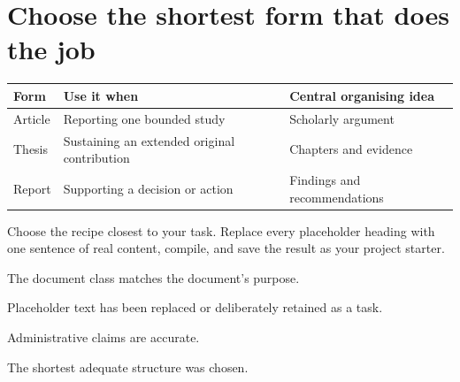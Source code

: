\section{Choose the shortest form that does the job}

\begin{center}
\begin{tabularx}{\linewidth}{@{}lXX@{}}
\toprule
Form & Use it when & Central organising idea \\
\midrule
Article & Reporting one bounded study & Scholarly argument \\
Thesis & Sustaining an extended original contribution & Chapters and evidence \\
Report & Supporting a decision or action & Findings and recommendations \\
\bottomrule
\end{tabularx}
\end{center}

\begin{codelab}
Choose the recipe closest to your task. Replace every placeholder heading with
one sentence of real content, compile, and save the result as your project
starter.
\end{codelab}

\begin{chapterchecklist}
  \item The document class matches the document's purpose.
  \item Placeholder text has been replaced or deliberately retained as a task.
  \item Administrative claims are accurate.
  \item The shortest adequate structure was chosen.
\end{chapterchecklist}
